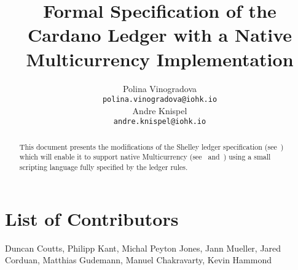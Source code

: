
\title{Formal Specification of the Cardano Ledger with a Native
Multicurrency Implementation}
\renewcommand{\thepage}{\arabic{page}}
\setcounter{page}{1}

\author{
   Polina Vinogradova \\ {\small \texttt{polina.vinogradova@iohk.io}} \\
   Andre Knispel \\ {\small \texttt{andre.knispel@iohk.io}} \\
   }

\date{}

\maketitle

\begin{abstract}
This document presents the modifications of the Shelley ledger
specification
(see~\cite{shelley_spec}) which will enable it to support native
Multicurrency (see~\cite{multi_currency} and~\cite{formal_multicur})
using a small scripting language fully specified
by the ledger rules.
\end{abstract}

\section*{List of Contributors}
\label{acknowledgements}

Duncan Coutts,
Philipp Kant,
Michal Peyton Jones,
Jann Mueller,
Jared Corduan,
Matthias Gudemann,
Manuel Chakravarty,
Kevin Hammond
